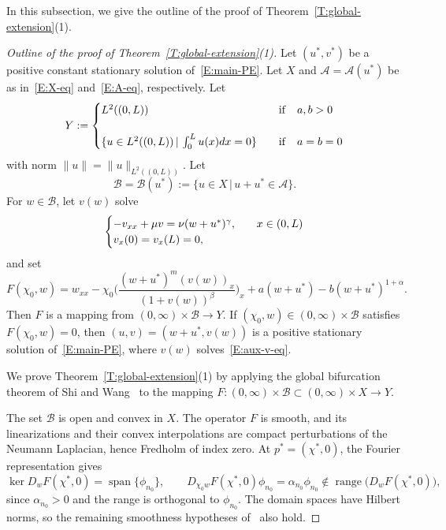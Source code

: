 \documentclass[11pt]{article} %
\theoremstyle{remark}
\theoremstyle{remark}
\numberwithin{equation}{section}
\numberwithin{figure}{section}
\numberwithin{table}{section}
\begin{document}
In this subsection, we give the outline of the proof of
Theorem~\ref{T:global-extension}(1).


\begin{proof}[Outline of the proof of Theorem~\ref{T:global-extension}(1)]
  Let $(u^*,v^*)$ be a positive constant stationary solution
  of~\eqref{E:main-PE}. Let $X$ and $\mathcal{A} = \mathcal{A}(u^*)$ be as
  in~\eqref{E:X-eq} and~\eqref{E:A-eq}, respectively. Let
  \begin{equation}\label{E:Y-eq}
    Y:=\begin{cases} L^2((0,L))\qquad &{\rm if}\quad a,b>0\cr\cr
      \{u\in L^2((0,L))\,|\, \int_0^L u(x)dx=0\}\quad &{\rm if}\quad a=b=0
    \end{cases}
  \end{equation}
  with norm $\|u\| = \|u\|_{L^2((0,L))}$. Let
  \begin{equation}\label{E:B-eq}
    \mathcal{B}=\mathcal{B}(u^*):=\{u\in X\,|\, u+u^*\in\mathcal{A}\}.
  \end{equation}
  For $w \in \mathcal{B}$, let $v(w)$ solve
  \begin{equation}\label{E:aux-v-eq}
    \begin{cases}
      -v_{xx}+\mu v=\nu(w+u^*)^\gamma,\quad &x\in (0,L)\cr
      v_x(0)=v_x(L)=0,
    \end{cases}
  \end{equation}
  and set
  \[
    F(\chi_0,w)
    =w_{xx}
    -\chi_0\Big(
    \frac{(w+u^*)^m (v(w))_x}{(1+v(w))^\beta}
    \Big)_x
    +a(w+u^*)-b(w+u^*)^{1+\alpha}.
  \]
  Then $F$ is a mapping from $(0, \infty)\times\mathcal{B} \to Y$. If
  $(\chi_0,w) \in (0, \infty)\times \mathcal{B}$ satisfies $F(\chi_0, w) = 0$,
  then $(u,v) = (w + u^*,v(w))$ is a positive stationary solution
  of~\eqref{E:main-PE}, where $v(w)$ solves~\eqref{E:aux-v-eq}.


  We prove Theorem~\ref{T:global-extension}(1) by applying the global
  bifurcation theorem of Shi and Wang~\cite[Theorem~4.4]{shi.wang:09:on} to the
  mapping $F:(0,\infty)\times\mathcal{B} \subset (0, \infty)\times X \to Y$.

  The set $\mathcal{B}$ is open and convex in $X$. The operator $F$ is smooth,
  and its linearizations and their convex interpolations are compact
  perturbations of the Neumann Laplacian, hence Fredholm of index zero. At $p^*
  = (\chi^*,0)$, the Fourier representation gives
  \[
    \ker D_wF(\chi^*, 0)=\operatorname{span}\{\phi_{n_0}\},
    \qquad
    D_{\chi_0w}F(\chi^*,0)\phi_{n_0}
    =\alpha_{n_0}\phi_{n_0}
    \notin\operatorname{range}\big(D_wF(\chi^*,0)\big),
  \]
  since $\alpha_{n_0} > 0$ and the range is orthogonal to $\phi_{n_0}$. The
  domain spaces have Hilbert norms, so the remaining smoothness hypotheses
  of~\cite[Theorem~4.4]{shi.wang:09:on} also hold.


\end{proof}
\end{document}
